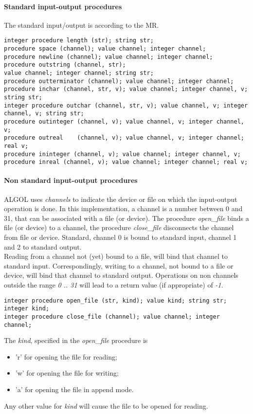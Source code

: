 \documentclass[11pt]{article}
\begin{document}
\paragraph{Standard input-output procedures}
The standard input/output is according to the MR.
{\footnotesize
\begin{verbatim}
integer procedure length (str); string str; 
procedure space (channel); value channel; integer channel; 
procedure newline (channel); value channel; integer channel;
procedure outstring (channel, str);
value channel; integer channel; string str; 
procedure outterminator (channel); value channel; integer channel; 
procedure inchar (channel, str, v); value channel; integer channel, v; string str; 
integer procedure outchar (channel, str, v); value channel, v; integer channel, v; string str; 
procedure outinteger (channel, v); value channel, v; integer channel, v; 
procedure outreal    (channel, v); value channel, v; integer channel; real v; 
procedure ininteger (channel, v); value channel; integer channel, v; 
procedure inreal (channel, v); value channel; integer channel; real v; 
\end{verbatim}
}
\paragraph{Non standard input-output procedures}
ALGOL uses {\em channels} to indicate the device or file
on which the input-output operation is done.
In this implementation, a channel is a number between 0 and 31,
that can be associated with a file (or device).
The procedure {\em open\_file} binds a file (or device) to a channel,
the procedure {\em close\_file} disconnects the channel from file or device.
Standard, channel 0 is bound to standard input, channel 1 and 2 to standard output.
\ \\
Reading from a channel not (yet) bound to a file,
will bind that channel to standard input.
Correspondingly, writing to a channel, not bound to a file or device,
will bind that channel to standard output.
Operations on non channels outside the range {\em 0 .. 31} will
lead to a return value (if appropriate) of {\em -1}.
{\footnotesize
\begin{verbatim}
integer procedure open_file (str, kind); value kind; string str; integer kind; 
integer procedure close_file (channel); value channel; integer channel; 
\end{verbatim}
}
The {\em kind}, specified in the {\em open\_file} procedure is
\begin{itemize}
\item 'r' for opening the file for reading;
\item 'w' for opening the file for writing;
\item 'a' for opening the file in append mode.
\end{itemize}
Any other value for {\em kind} will cause the file to be opened for reading.
\end{document}
